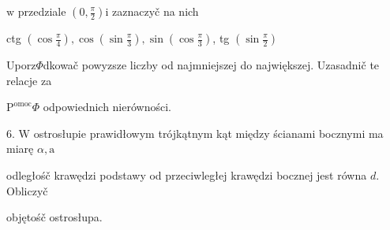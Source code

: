 \documentclass[a4paper,12pt]{article}
\begin{document}
$\mathrm{w}$ przedziale $(0,\displaystyle \frac{\pi}{2}) \mathrm{i}$ zaznaczyč na nich

ctg $(\displaystyle \cos\frac{\pi}{4}), \displaystyle \cos(\sin\frac{\pi}{3}), \displaystyle \sin(\cos\frac{\pi}{3})$, tg $(\displaystyle \sin\frac{\pi}{2})$

Uporz$\Phi$dkowač powyzsze liczby od najmniejszej do największej. Uzasadnič te relacje za

$\mathrm{P}^{\mathrm{o}\mathrm{m}\mathrm{o}\mathrm{c}}\Phi$ odpowiednich nierówności.

6. $\mathrm{W}$ ostrosłupie prawidłowym trójkątnym kąt między ścianami bocznymi ma miarę $\alpha, \mathrm{a}$

odległośč krawędzi podstawy od przeciwległej krawędzi bocznej jest równa $d$. Obliczyč

objętośč ostrosłupa.
\end{document}
